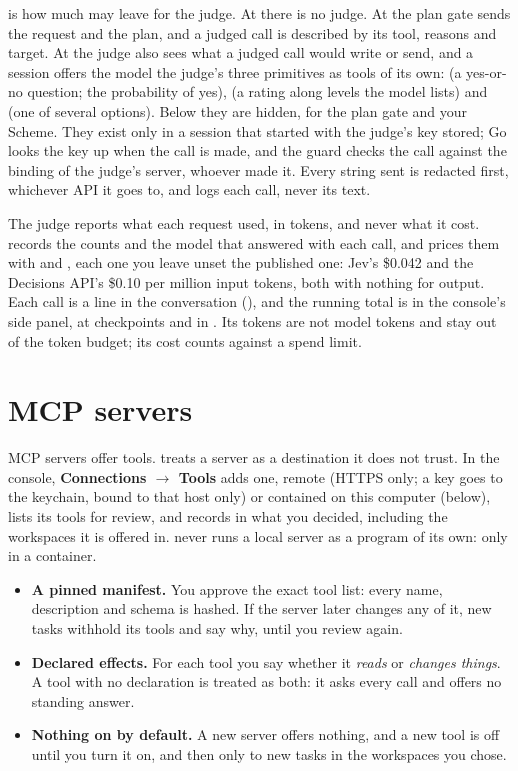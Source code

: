  is how much may leave for the judge. At  there is
no judge. At  the plan gate sends the request and the plan, and
a judged call is described by its tool, reasons and target. At 
the judge also sees what a judged call would write or send, and a session
offers the model the judge's three primitives as tools of its own:
 (a yes-or-no question; the probability of yes),
 (a rating along levels the model lists) and
 (one of several options). Below  they are
hidden, for the plan gate and your Scheme. They exist only in a session
that started with the judge's key stored; Go looks the key up when the
call is made, and the guard checks the call against the binding of the
judge's server, whoever made it. Every string sent is redacted first, whichever API it goes to, and
 logs each call, never its text.

The judge reports what each request used, in tokens, and never what it
cost. \nodwyn{} records the counts and the model that answered with each
call, and prices them with  and ,
each one you leave unset the published one: Jev's \$0.042 and the
Decisions API's \$0.10 per million input tokens, both with nothing for
output. Each call is a line in the conversation
(), and the running total
is in the console's side panel, at checkpoints and in . Its
tokens are not model tokens and stay out of the token budget; its cost
counts against a spend limit.

\section{MCP servers}

MCP servers offer tools. \nodwyn{} treats a server as a destination it
does not trust. In the console, \textbf{Connections \(\rightarrow\)
Tools} adds one, remote (HTTPS only; a key goes to the keychain, bound to
that host only) or contained on this computer (below), lists its tools for
review, and records in  what you decided, including the
workspaces it is offered in. \nodwyn{} never runs a local server as a
program of its own: only in a container.

\begin{itemize}
  \item \textbf{A pinned manifest.} You approve the exact tool list: every
    name, description and schema is hashed. If the server later changes
    any of it, new tasks withhold its tools and say why, until you review
    again.
  \item \textbf{Declared effects.} For each tool you say whether it
    \emph{reads} or \emph{changes things}. A tool with no declaration is
    treated as both: it asks every call and offers no standing answer.
  \item \textbf{Nothing on by default.} A new server offers nothing, and a
    new tool is off until you turn it on, and then only to new tasks in the
    workspaces you chose.
\end{itemize}

